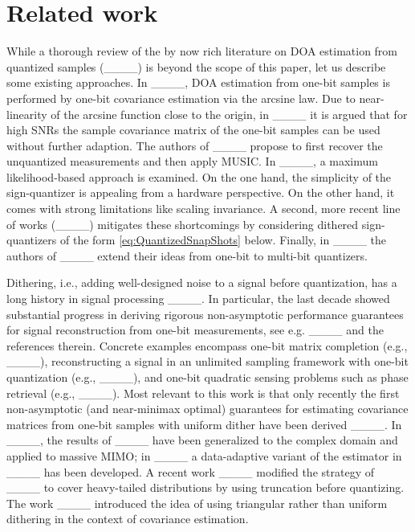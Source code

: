 \section{Related work}
\label{sec:RelatedWork}

While a thorough review of the by now rich literature on DOA estimation from quantized samples (____) is beyond the scope of this paper, let us describe some existing approaches. In ____, DOA estimation from one-bit samples is performed by one-bit covariance estimation via the arcsine law. Due to near-linearity of the arcsine function close to the origin, in ____ it is argued that for high SNRs the sample covariance matrix of the one-bit samples can be used without further adaption. The authors of ____ propose to first recover the unquantized measurements and then apply MUSIC. In ____, a maximum likelihood-based approach is examined.
On the one hand, the simplicity of the sign-quantizer is appealing from a hardware perspective. On the other hand, it comes with strong limitations like scaling invariance. A second, more recent line of works (____) mitigates these shortcomings by considering dithered sign-quantizers of the form \eqref{eq:QuantizedSnapShots} below. Finally, in ____ the authors of ____ extend their ideas from one-bit to multi-bit quantizers.

Dithering, i.e., adding well-designed noise to a signal before quantization, has a long history in signal processing ____. In particular, the last decade showed substantial progress in deriving rigorous non-asymptotic performance guarantees for signal reconstruction from one-bit measurements, see e.g. ____ and the references therein. Concrete examples encompass one-bit matrix completion (e.g., ____), reconstructing a signal in an unlimited sampling framework with one-bit quantization (e.g., ____), and one-bit quadratic sensing problems such as phase retrieval (e.g., ____). Most relevant to this work is that only recently the first non-asymptotic (and near-minimax optimal) guarantees for estimating covariance matrices from one-bit samples with uniform dither have been derived ____. In ____, the results of ____ have been generalized to the complex domain and applied to massive MIMO; in ____ a data-adaptive variant of the estimator in ____ has been developed. A recent work ____ modified the strategy of ____ to cover heavy-tailed distributions by using truncation before quantizing. The work ____ introduced the idea of using triangular rather than uniform dithering in the context of covariance estimation. 

